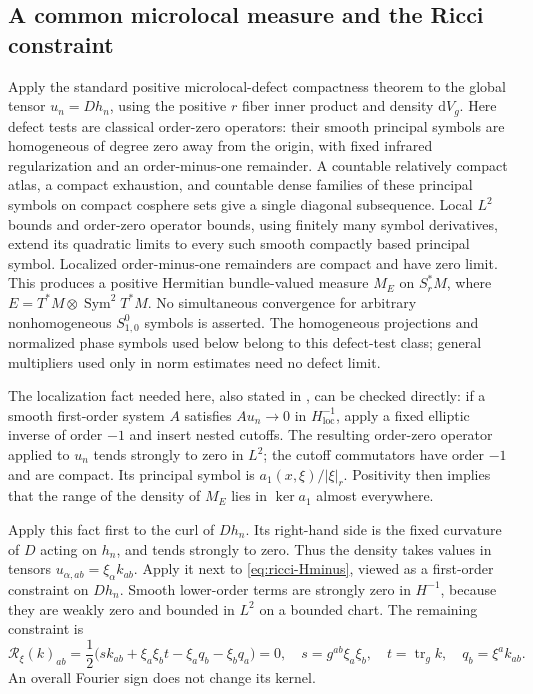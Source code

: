 \documentclass[11pt,a4paper]{article}
\numberwithin{equation}{section}
\newcommand{\tr}{\operatorname{tr}}
\newcommand{\loc}{\mathrm{loc}}
\newcommand{\dd}{\mathrm d}
\newcommand{\dV}{\dd V_g}
\newcommand{\f}[2]{\frac{#1}{#2}}
\theoremstyle{definition}
\begin{document}
\subsection{A common microlocal measure and the Ricci constraint}

Apply the standard positive microlocal-defect compactness theorem
\cite[Theorem~5.5]{HLelliptic} to the global tensor $u_n=Dh_n$, using
the positive $r$ fiber inner product and density $\dV$.
Here defect tests are classical order-zero operators: their smooth
principal symbols are homogeneous of degree zero away from the origin,
with fixed infrared regularization and an order-minus-one remainder.
A countable relatively compact atlas, a compact exhaustion, and
countable dense families of these principal symbols on compact
cosphere sets give a single diagonal subsequence. Local $L^2$ bounds
and order-zero operator bounds, using finitely many symbol derivatives,
extend its quadratic limits to every such smooth compactly based
principal symbol. Localized order-minus-one remainders are compact
and have zero limit. This produces a positive Hermitian bundle-valued
measure $M_E$ on $S_r^*M$, where
$E=T^*M\otimes\operatorname{Sym}^2T^*M$.
No simultaneous convergence for arbitrary nonhomogeneous
$S^0_{1,0}$ symbols is asserted. The homogeneous projections and
normalized phase symbols used below belong to this defect-test class;
general multipliers used only in norm estimates need no defect limit.

The localization fact needed here, also stated in \cite[Theorem~5.6]{HLelliptic}, can be checked directly: if a smooth first-order system $A$ satisfies $Au_n\to0$ in $H^{-1}_{\loc}$, apply a fixed elliptic inverse of order $-1$ and insert nested cutoffs. The resulting order-zero operator applied to $u_n$ tends strongly to zero in $L^2$; the cutoff commutators have order $-1$ and are compact. Its principal symbol is $a_1(x,\xi)/|\xi|_r$. Positivity then implies that the range of the density of $M_E$ lies in $\ker a_1$ almost everywhere.

Apply this fact first to the curl of $Dh_n$. Its right-hand side is the fixed curvature of $D$ acting on $h_n$, and tends strongly to zero. Thus the density takes values in tensors $u_{\alpha,ab}=\xi_\alpha k_{ab}$. Apply it next to \eqref{eq:ricci-Hminus}, viewed as a first-order constraint on $Dh_n$. Smooth lower-order terms are strongly zero in $H^{-1}$, because they are weakly zero and bounded in $L^2$ on a bounded chart. The remaining constraint is
\begin{equation}\label{eq:ricci-symbol}
\mathcal R_\xi(k)_{ab}=\f12\bigl(s k_{ab}+\xi_a\xi_b t-\xi_aq_b-\xi_bq_a\bigr)=0,
\quad s=g^{ab}\xi_a\xi_b,\quad t=\tr_gk,\quad q_b=\xi^ak_{ab}.
\end{equation}
An overall Fourier sign does not change its kernel.
\end{document}
